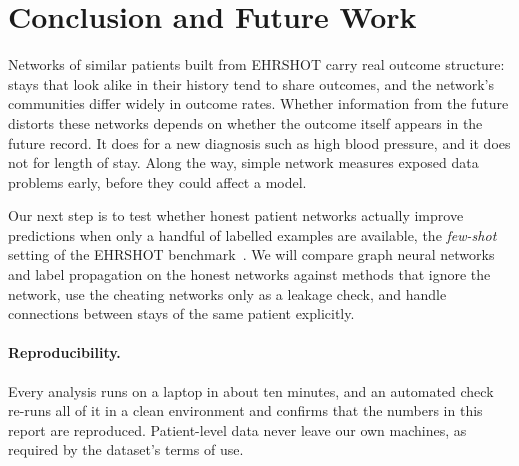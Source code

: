 \section{Conclusion and Future Work}
\label{sec:conclusion}

Networks of similar patients built from EHRSHOT carry real outcome structure: stays that look alike in their history tend to share outcomes, and the network's communities differ widely in outcome rates. Whether information from the future distorts these networks depends on whether the outcome itself appears in the future record. It does for a new diagnosis such as high blood pressure, and it does not for length of stay. Along the way, simple network measures exposed data problems early, before they could affect a model.

Our next step is to test whether honest patient networks actually improve predictions when only a handful of labelled examples are available, the \emph{few-shot} setting of the EHRSHOT benchmark~\cite{wornow2023ehrshot}. We will compare graph neural networks and label propagation on the honest networks against methods that ignore the network, use the cheating networks only as a leakage check, and handle connections between stays of the same patient explicitly.

\paragraph{Reproducibility.} Every analysis runs on a laptop in about ten minutes, and an automated check re-runs all of it in a clean environment and confirms that the numbers in this report are reproduced. Patient-level data never leave our own machines, as required by the dataset's terms of use.
